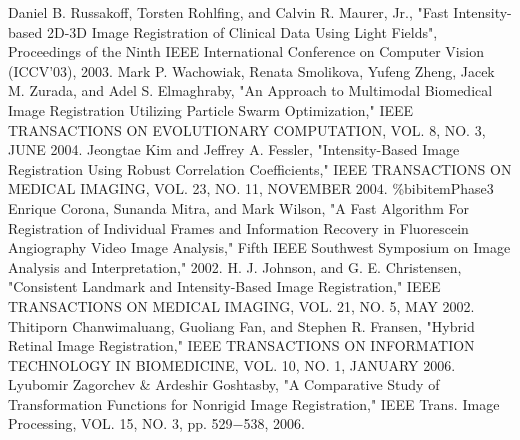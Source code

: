 \begin{thebibliography}{300}
 Daniel B. Russakoff, Torsten Rohlfing, and Calvin R. Maurer, Jr.,  "Fast Intensity-based 2D-3D Image Registration of Clinical Data Using Light Fields", Proceedings of the Ninth IEEE International Conference on Computer Vision (ICCV'03), 2003.%
 Mark P. Wachowiak, Renata Smolikova, Yufeng Zheng, Jacek M. Zurada, and Adel S. Elmaghraby, "An Approach to Multimodal Biomedical Image Registration Utilizing Particle Swarm Optimization," IEEE TRANSACTIONS ON EVOLUTIONARY COMPUTATION, VOL. 8, NO. 3, JUNE 2004. %
 Jeongtae Kim and Jeffrey A. Fessler, "Intensity-Based Image Registration Using Robust Correlation Coefficients," IEEE TRANSACTIONS ON MEDICAL IMAGING, VOL. 23, NO. 11, NOVEMBER 2004.%
\%bibitem{Phase3} Enrique Corona, Sunanda Mitra, and Mark Wilson, "A Fast Algorithm For Registration of Individual Frames and Information Recovery in Fluorescein Angiography Video Image Analysis," Fifth IEEE Southwest Symposium on Image Analysis and Interpretation," 2002. %
 H. J. Johnson, and G. E. Christensen, "Consistent Landmark and Intensity-Based Image Registration," IEEE TRANSACTIONS ON MEDICAL IMAGING, VOL. 21, NO. 5, MAY 2002.%
 Thitiporn Chanwimaluang, Guoliang Fan, and Stephen R. Fransen, "Hybrid Retinal Image Registration," IEEE TRANSACTIONS ON INFORMATION TECHNOLOGY IN BIOMEDICINE, VOL. 10, NO. 1, JANUARY 2006. %
 Lyubomir Zagorchev \& Ardeshir Goshtasby, "A Comparative Study of Transformation Functions for Nonrigid Image Registration," IEEE Trans. Image Processing, VOL. 15, NO. 3, pp. 529$-$538, 2006. %


\end{thebibliography}
